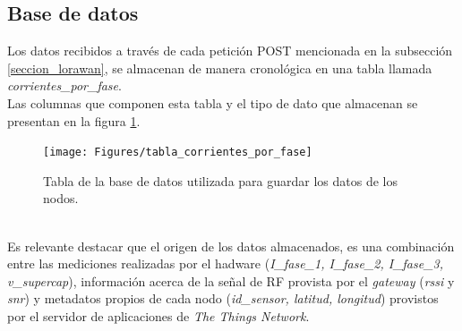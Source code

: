 \subsection{Base de datos}
Los datos recibidos a trav\'{e}s de cada petición POST mencionada en la subsecci\'{o}n \ref{seccion_lorawan}, se almacenan de manera cronológica en una tabla llamada \textit{corrientes\_por\_fase}.\\
Las columnas que componen esta tabla y el tipo de dato que almacenan se presentan en la figura \ref{fig:tablacorrientesporfase}.\\
\begin{figure}[h]
	\centering
	\texttt{[image: Figures/tabla\_corrientes\_por\_fase]}
	\caption{Tabla de la base de datos utilizada para guardar los datos de los nodos.}
	\label{fig:tablacorrientesporfase}
\end{figure}\\
Es relevante destacar que el origen de los datos almacenados, es una combinación entre las mediciones realizadas por el hadware (\textit{I\_fase\_1, I\_fase\_2, I\_fase\_3, v\_supercap}), información acerca de la señal de RF provista por el \textit{gateway} (\textit{rssi} y \textit{snr}) y metadatos propios de cada nodo (\textit{id\_sensor, latitud, longitud}) provistos por el servidor de aplicaciones de \textit{The Things Network}.\\


